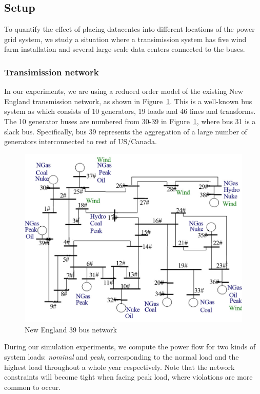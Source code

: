 \subsection{Setup}
To quantify the effect of placing datacentes into different locations of the power grid system, we study a situation where a transimission system has five wind farm installation and several large-scale data centers connected to the buses.

\subsubsection{Transimission network}
In our experiments, we are using a reduced order model of the existing New England transmission network, as shown in Figure~\ref{fig:newengland}. This is a well-known bus system \cite{bills1970line} as which consists of 10 generators, 19 loads and 46 lines and transforms. The 10 generator buses are numbered from 30-39 in Figure~\ref{fig:newengland}, where bus 31 is a slack bus. Specifically, bus 39 represents the aggregation of a large number of generators interconnected to rest of US/Canada. 

\begin{figure}[ht]
\centering
\includegraphics[width=1\columnwidth]{img/newEngland.jpg}
\caption{New England 39 bus network}
\label{fig:newengland}
\end{figure}

During our simulation experiments, we compute the power flow for two kinds of system loads: \textsl{nominal} and \textsl{peak}, corresponding to the normal load  and the highest load throughout a whole year respectively. Note that the network constraints will become tight when facing peak load, where violations are more common to occur.

